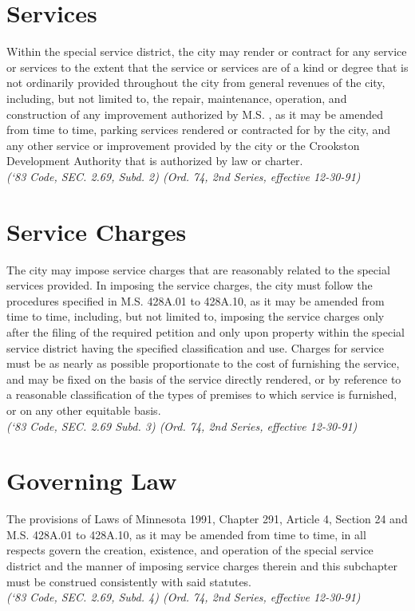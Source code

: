 \section{Services}
Within the special service district, the city may render or contract for any service or services to the extent that the service or services are of a kind or degree that is not ordinarily provided throughout the city from general revenues of the city, including, but not limited to, the repair, maintenance, operation, and construction of any improvement authorized by M.S. , as it may be amended from time to time, parking services rendered or contracted for by the city, and any other service or improvement provided by the city or the Crookston Development Authority that is authorized by law or charter.\\
\emph{(‘83 Code, SEC. 2.69, Subd. 2)  (Ord. 74, 2nd Series, effective 12-30-91)}
\section{Service Charges}
The city may impose service charges that are reasonably related to the special services provided.  In imposing the service charges, the city must follow the procedures specified in M.S. \textsection 428A.01 to \textsection 428A.10, as it may be amended from time to time, including, but not limited to, imposing the service charges only after the filing of the required petition and only upon property within the special service district having the specified classification and use.  Charges for service must be as nearly as possible proportionate to the cost of furnishing the service, and may be fixed on the basis of the service directly rendered, or by reference to a reasonable classification of the types of premises to which service is furnished, or on any other equitable basis.\\
\emph{(‘83 Code, SEC. 2.69 Subd. 3)  (Ord. 74, 2nd Series, effective 12-30-91)}
\section{Governing Law}
The provisions of Laws of Minnesota 1991, Chapter 291, Article 4, Section 24 and M.S. \textsection 428A.01 to \textsection 428A.10, as it may be amended from time to time, in all respects govern the creation, existence, and operation of the special service district and the manner of imposing service charges therein and this subchapter must be construed consistently with said statutes.\\
\emph{(‘83 Code, SEC. 2.69, Subd. 4)  (Ord. 74, 2nd Series, effective 12-30-91)}\\

